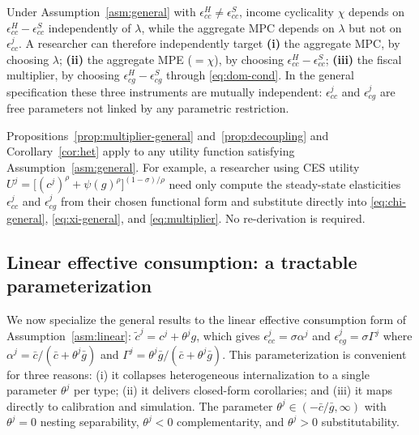 \begin{proposition}\label{prop:decoupling}
Under Assumption~\ref{asm:general} with $\epsilon^{H}_{cc}\neq\epsilon^{S}_{cc}$,
income cyclicality $\chi$ depends on $\epsilon^{H}_{cc}-\epsilon^{S}_{cc}$
independently of $\lambda$, while the aggregate MPC depends on $\lambda$ but
not on $\epsilon^{j}_{cc}$. A researcher can therefore independently target
\textbf{(i)} the aggregate MPC, by choosing $\lambda$;
\textbf{(ii)} the aggregate MPE ($=\chi$), by choosing
$\epsilon^{H}_{cc}-\epsilon^{S}_{cc}$;
\textbf{(iii)} the fiscal multiplier, by choosing
$\epsilon^{H}_{cg}-\epsilon^{S}_{cg}$ through \eqref{eq:dom-cond}.
In the general specification these three instruments are mutually independent:
$\epsilon^{j}_{cc}$ and $\epsilon^{j}_{cg}$ are free parameters not linked by
any parametric restriction.
\end{proposition}

\begin{remark}
Propositions~\ref{prop:multiplier-general} and~\ref{prop:decoupling} and
Corollary~\ref{cor:het} apply to any utility function satisfying
Assumption~\ref{asm:general}. For example, a researcher using CES utility
$U^{j}=\bigl[(c^{j})^{\rho}+\psi(g)^{\rho}\bigr]^{(1-\sigma)/\rho}$ need only
compute the steady-state elasticities $\epsilon^{j}_{cc}$ and $\epsilon^{j}_{cg}$
from their chosen functional form and substitute directly into
\eqref{eq:chi-general}, \eqref{eq:xi-general}, and \eqref{eq:multiplier}. No
re-derivation is required.
\end{remark}

\subsection{Linear effective consumption: a tractable
parameterization}\label{subsec:linear-effective}
We now specialize the general results to the linear effective consumption form
of Assumption~\ref{asm:linear}: $\tilde c^{j}=c^{j}+\theta^{j}g$, which gives
$\epsilon^{j}_{cc}=\sigma\alpha^{j}$ and $\epsilon^{j}_{cg}=\sigma\Gamma^{j}$
where $\alpha^{j}=\bar c/(\bar c+\theta^{j}\bar g)$ and
$\Gamma^{j}=\theta^{j}\bar g/(\bar c+\theta^{j}\bar g)$. This parameterization
is convenient for three reasons: (i) it collapses heterogeneous internalization
to a single parameter $\theta^{j}$ per type; (ii) it delivers closed-form
corollaries; and (iii) it maps directly to calibration and simulation. The
parameter $\theta^{j}\in(-\bar c/\bar g,\infty)$ with $\theta^{j}=0$ nesting
separability, $\theta^{j}<0$ complementarity, and $\theta^{j}>0$
substitutability.

